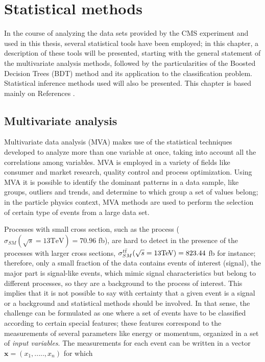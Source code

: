 \setcounter{chapter}{4}
\chapter{Statistical methods}\label{ch:stat}

In the course of analyzing the data sets provided by the CMS experiment and used in this thesis, several statistical tools have been employed; in this chapter, a description of these tools will be presented, starting with the general statement of the multivariate analysis methods, followed by the particularities of the Boosted Decision Trees (BDT) method and its application to the classification problem. Statistical inference methods used will also be presented. This chapter is based mainly on References \cite{mva, tmva, luca}.      

\section{Multivariate analysis}\label{sec:mva}

Multivariate data analysis (MVA) makes use of the statistical techniques developed to analyze more than one variable at once, taking into account all the correlations among variables. MVA is employed in a variety of fields like consumer and market research, quality control and process optimization. Using MVA it is possible to identify the dominant patterns in a data sample, like groups, outliers and trends, and determine to which group a set of values belong; in the particle physics context, MVA methods are used to perform the selection of certain type of events from a large data set.

Processes with small cross section, such as the \tHq process ($\sigma_{SM}(\sqrt{s}=13 \textrm{TeV})=70.96$ fb), are hard to detect in the presence of the processes with larger cross sections, $\sigma_{SM}^{t\bar{t}}(\sqrt{s}=13 \textrm{TeV})=823.44$ fb for instance; therefore, only a small fraction of the data contains events of interest (signal), the major part is signal-like events, which mimic signal characteristics but belong to different processes, so they are a background to the process of interest. This implies that it is not possible to say with certainty that a given event is a signal or a background and statistical methods should be involved. In that sense, the challenge can be formulated as one where a set of events have to be classified according to certain special features; these features correspond to the measurements of several parameters like energy or momentum, organized in a set of \textit{input variables}. The measurements for each event can be written in a vector $\textbf{x}=(x_1,.....,x_n)$ for which

